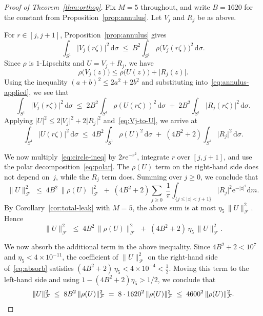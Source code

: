 \documentclass[11pt]{amsart}
\theoremstyle{remark}
\begin{document}
\begin{proof}[Proof of Theorem~\ref{thm:orthog}]
Fix $M = 5$ throughout, and write $B = 1620$ for the constant from
Proposition~\ref{prop:annulus}.  Let $V_j$ and $R_j$ be as above.

\medskip
\noindent
For $r \in [j, j{+}1]$, Proposition~\ref{prop:annulus} gives
\begin{equation}\label{eq:annulus-applied}
\int_{S^1}\lvert V_j(r\zeta) \rvert^2\,\mathrm{d}\sigma
\;\le\;
B^2\int_{S^1}\rho\bigl(V_j(r\zeta)\bigr)^2\,\mathrm{d}\sigma.
\end{equation}
Since $\rho$ is $1$-Lipschitz and $U = V_j + R_j$, we have
\[
\rho\bigl(V_j(z)\bigr)
\le \rho\bigl(U(z)\bigr) + \lvert R_j(z) \rvert.
\]
Using the inequality $(a+b)^2 \le 2a^2 + 2b^2$ and substituting
into~\eqref{eq:annulus-applied}, we see that
\begin{equation}\label{eq:Vj-to-U}
\int_{S^1}\lvert V_j(r\zeta) \rvert^2\,\mathrm{d}\sigma
\;\le\;
2B^2\!\int_{S^1}\rho(U(r\zeta))^2\,\mathrm{d}\sigma
\;+\; 2B^2\!\int_{S^1}\lvert R_j(r\zeta) \rvert^2\,\mathrm{d}\sigma.
\end{equation}
Applying $\lvert U \rvert^2 \le 2\lvert V_j \rvert^2 + 2\lvert R_j \rvert^2$
and~\eqref{eq:Vj-to-U}, we arrive at
\begin{equation}\label{eq:circle-ineq}
\int_{S^1}\lvert U(r\zeta) \rvert^2\,\mathrm{d}\sigma
\;\le\;
4B^2\!\int_{S^1}\rho(U)^2\,\mathrm{d}\sigma
\;+\; (4B^2 + 2)\!\int_{S^1}\lvert R_j \rvert^2\,\mathrm{d}\sigma.
\end{equation}

\medskip
\noindent
We now multiply~\eqref{eq:circle-ineq} by $2r\mathrm{e}^{-r^2}$, integrate $r$ over
$[j, j{+}1]$, and use the polar decomposition~\eqref{eq:polar}.  The
$\rho(U)$ term on the right-hand side does not depend on~$j$, while the $R_j$ term does.  Summing over $j \ge 0$, we conclude that
\[
\lVert U \rVert_{\mathcal{F}}^2
\;\le\;
4B^2\,\lVert \rho(U) \rVert_{\mathcal{F}}^2
\;+\;
(4B^2 + 2)\sum_{j \ge 0}\;
\frac{1}{\pi}\int_{\{j \le \lvert z \rvert < j+1\}}\!\!
\lvert R_j \rvert^2\mathrm{e}^{-\lvert z \rvert^2}\mathrm{d} m.
\]
By Corollary~\ref{cor:total-leak} with $M = 5$, the above sum is at
most $\eta_5\,\lVert U \rVert_{\mathcal{F}}^2$.  Hence
\begin{equation}\label{eq:absorb}
\lVert U \rVert_{\mathcal{F}}^2
\;\le\;
4B^2\,\lVert \rho(U) \rVert_{\mathcal{F}}^2
\;+\;
(4B^2 + 2)\,\eta_5\,\lVert U \rVert_{\mathcal{F}}^2.
\end{equation}

\medskip
\noindent
We now absorb the additional term in the above inequality.
Since $4B^2 + 2 < 10^7$ and $\eta_5 < 4 \times 10^{-11}$, the coefficient
of $\lVert U \rVert_{\mathcal{F}}^2$ on the right-hand side of~\eqref{eq:absorb} satisfies
$(4B^2 + 2)\,\eta_5 < 4 \times 10^{-4} < \tfrac{1}{2}$.
Moving this term to the left-hand side and using $1 - (4B^2+2)\eta_5 > 1/2$, we conclude that
\[
\lVert U \rVert_{\mathcal{F}}^2
\;\le\; 8B^2\,\lVert \rho(U) \rVert_{\mathcal{F}}^2
\;=\; 8 \cdot 1620^2\,\lVert \rho(U) \rVert_{\mathcal{F}}^2
\;\le\; 4600^2\,\lVert \rho(U) \rVert_{\mathcal{F}}^2.\qedhere
\]
\end{proof}
\end{document}
